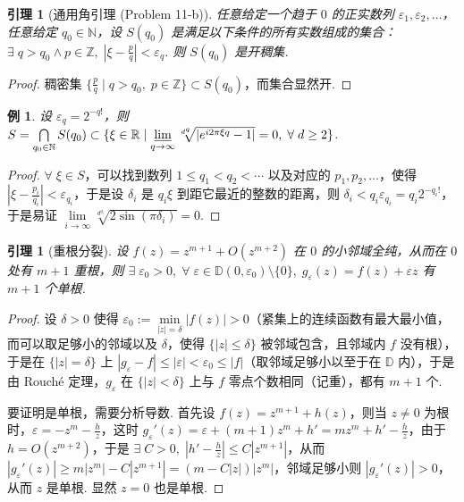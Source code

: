 \documentclass[11pt, a4paper, oneside]{ctexart}
\newtheorem{example}[theorem]{例}
\newtheorem{lemma}[theorem]{引理}
\newcommand{\D}{\mathbb{D}}
\newcommand{\N}{\mathbb{N}}
\newcommand{\R}{\mathbb{R}}
\newcommand{\Z}{\mathbb{Z}}
\newcommand{\abs}[1]{\left|{#1}\right|}
\begin{document}
    \begin{lemma}[通用角引理 (Problem 11-b)]
        任意给定一个趋于 $0$ 的正实数列 $\varepsilon_1,\varepsilon_2,\ldots$，任意给定 $q_0\in\N$，设 $S(q_0)$ 是满足以下条件的所有实数组成的集合：$\exists\; q>q_0\wedge p\in\Z,\;\abs{\xi-\frac{p}{q}}<\varepsilon_q$. 则 $S(q_0)$ 是开稠集.
    \end{lemma}
    \begin{proof}
        稠密集 $\{\frac{p}{q}\mid q>q_0,\; p\in\Z\}\subset S(q_0)$，而集合显然开.
    \end{proof}
    \begin{example}\label{例1.9}
        设 $\varepsilon_q=2^{-q!}$，则 $S=\bigcap\limits_{q_0\in\N}S(q_0)\subset\{\xi\in\R\mid \varliminf\limits_{q\to \infty}\sqrt[d^q]{\abs{e^{i 2\pi \xi q}-1}}=0,\;\forall\; d\geq 2\}$.
    \end{example}
    \begin{proof}
        $\forall\; \xi\in S$，可以找到数列 $1\leq q_1<q_2<\cdots$ 以及对应的 $p_1,p_2,\ldots$，使得 $\abs{\xi-\frac{p_i}{q_i}}<\varepsilon_{q_i}$，于是设 $\delta_i$ 是 $q_i \xi$ 到距它最近的整数的距离，则 $\delta_i<q_i\varepsilon_{q_i}=q_i 2^{-q_i!}$，于是易证 $\lim\limits_{i\to\infty}\sqrt[d^{q_i}]{2\sin(\pi\delta_i)}=0$.
    \end{proof}

    \begin{lemma}[重根分裂]\label{重根分裂}
        设 $f(z)=z^{m+1}+O(z^{m+2})$ 在 $0$ 的小邻域全纯，从而在 $0$ 处有 $m+1$ 重根，则 $\exists\; \varepsilon_0>0,\;\forall\; \varepsilon\in\D(0,\varepsilon_0)\setminus\{0\},\; g_{\varepsilon}(z)=f(z)+\varepsilon z$ 有 $m+1$ 个单根.
    \end{lemma}
    \begin{proof}
        设 $\delta>0$ 使得 $\varepsilon_0:=\min\limits_{\abs{z}=\delta}\abs{f(z)}>0$（紧集上的连续函数有最大最小值，而可以取足够小的邻域以及 $\delta$，使得 $\{\abs{z}\leq \delta\}$ 被邻域包含，且邻域内 $f$ 没有根），于是在 $\{\abs{z}=\delta\}$ 上 $\abs{g_{\varepsilon}-f}\leq \abs{\varepsilon}<\varepsilon_0\leq \abs{f}$（取邻域足够小以至于在 $\D$ 内），于是由 Rouché 定理，$g_{\varepsilon}$ 在 $\{\abs{z}<\delta\}$ 上与 $f$ 零点个数相同（记重），都有 $m+1$ 个.

        要证明是单根，需要分析导数. 首先设 $f(z)=z^{m+1}+h(z)$，则当 $z\neq 0$ 为根时，$\varepsilon=-z^m-\frac{h}{z}$，这时 $g_{\varepsilon}'(z)=\varepsilon+(m+1)z^m+h'=mz^m+h'-\frac{h}{z}$，由于 $h=O(z^{m+2})$，于是 $\exists\; C>0,\;\abs{h'-\frac{h}{z}}\leq C\abs{z^{m+1}}$，从而 $\abs{g_{\varepsilon}'(z)}\geq m\abs{z^m}-C\abs{z^{m+1}}=(m-C\abs{z})\abs{z^m}$，邻域足够小则 $\abs{g_{\varepsilon}'(z)}>0$，从而 $z$ 是单根. 显然 $z=0$ 也是单根.
    \end{proof}
\end{document}

